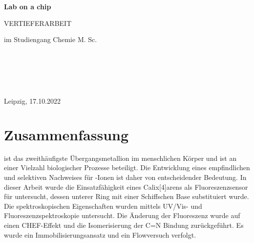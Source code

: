 \documentclass[12pt,a4paper]{report}
\begin{document}
\begin{titlepage}
	\centering
	{\LARGE \textbf{Lab on a chip}\par}
	\vspace{1cm}
	{\large\MakeUppercase{Vertieferarbeit}\par}
	\vspace{1cm}
	\vspace{0.5cm}
	{im Studiengang Chemie M. Sc.\par}
	\vspace{0.5 cm}
	\vspace{2 cm}
	 \\
	 \\
	\vspace{2cm}
	 \\
	\vspace{0.35cm}
	 \\
	\vspace{0.35cm}
	\vfill
	{Leipzig, 17.10.2022   \par}
	
\end{titlepage}
	\chapter{Zusammenfassung}
	\noindent {} ist das zweithäufigste Übergangsmetallion im menschlichen Körper und ist an einer Vielzahl biologischer Prozesse beteiligt. Die Entwicklung eines empfindlichen und selektiven Nachweises für -Ionen ist daher von entscheidender Bedeutung. In dieser Arbeit wurde die Einsatzfähigkeit eines Calix[4]arens als Fluoreszenzsensor für  untersucht, dessen unterer Ring mit einer Schiffschen Base substituiert wurde. Die spektroskopischen Eigenschaften wurden mittels UV/Vis- und Fluoreszenzspektroskopie untersucht. Die Änderung der Fluoreszenz wurde auf einen CHEF-Effekt und die Isomerisierung der C=N Bindung zurückgeführt. Es wurde ein Immobilisierungsansatz und ein Flowversuch verfolgt. 
	\tableofcontents
\end{document}
